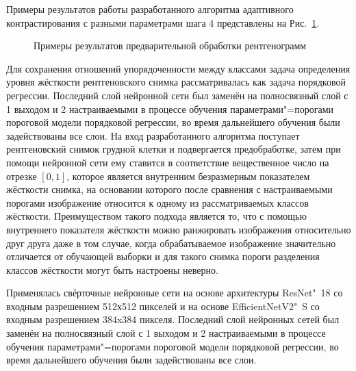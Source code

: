 \noindent Примеры результатов работы разработанного алгоритма адаптивного контрастирования с разными параметрами шага 4 представлены на Рис.~\ref{fig:synopsis-preprocessing-examples}.

\begin{figure}[ht]
	\caption{Примеры результатов предварительной обработки рентгенограмм}
	\label{fig:synopsis-preprocessing-examples}
\end{figure}

Для сохранения отношений упорядоченности между классами задача определения уровня жёсткости рентгеновского снимка рассматривалась как задача порядковой регрессии. Последний слой нейронной сети был заменён на полносвязный слой с 1 выходом и 2 настраиваемыми в процессе обучения параметрами"=порогами пороговой модели порядковой регрессии, во время дальнейшего обучения были задействованы все слои. На вход разработанного алгоритма поступает рентгеновский снимок грудной клетки и подвергается предобработке, затем при помощи нейронной сети ему ставится в соответствие вещественное число на отрезке $\left[0, 1\right]$, которое является внутренним безразмерным показателем жёсткости снимка, на основании которого после сравнения с настраиваемыми порогами изображение относится к одному из рассматриваемых классов жёсткости. Преимуществом такого подхода является то, что с помощью внутреннего показателя жёсткости можно ранжировать изображения относительно друг друга даже в том случае, когда обрабатываемое изображение значительно отличается от обучающей выборки и для такого снимка пороги разделения классов жёсткости могут быть настроены неверно.

Применялась свёрточные нейронные сети на основе архитектуры ResNet"~18 
со входным разрешением 512х512 пикселей и на основе EfficientNetV2"~S 
со входным разрешением 384x384 пикселя. Последний слой нейронных сетей был заменён на полносвязный слой с 1 выходом и 2 настраиваемыми в процессе обучения параметрами"=порогами пороговой модели порядковой регрессии,
во время дальнейшего обучения были задействованы все слои.

